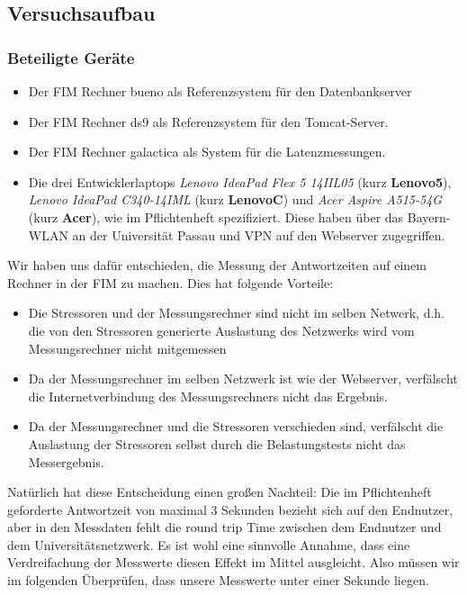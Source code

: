 
\subsection{Versuchsaufbau}

\subsubsection{Beteiligte Geräte}
\begin{itemize}
	\item Der FIM Rechner bueno als Referenzsystem für den Datenbankserver
	\item Der FIM Rechner ds9 als Referenzsystem für den Tomcat-Server.
	\item Der FIM Rechner galactica als System für die Latenzmessungen.
	\item Die drei Entwicklerlaptops \emph{Lenovo IdeaPad Flex 5 14IIL05} (kurz \textbf{Lenovo5}), \emph{Lenovo IdeaPad C340-14IML} (kurz \textbf{LenovoC}) und \emph{Acer Aspire A515-54G} (kurz \textbf{Acer}), wie im Pflichtenheft spezifiziert. Diese haben über das Bayern-WLAN an der Universität Passau und VPN auf den Webserver zugegriffen.
\end{itemize}
Wir haben uns dafür entschieden, die Messung der Antwortzeiten auf einem Rechner in der FIM zu machen. Dies hat folgende Vorteile:
\begin{itemize}
	\item Die Stressoren und der Messungsrechner sind nicht im selben Netwerk, d.h. die von den Stressoren generierte Auslastung des Netzwerks wird vom Messungsrechner nicht mitgemessen
	\item Da der Messungsrechner im selben Netzwerk ist wie der Webserver, verfälscht die Internetverbindung des Messungsrechners nicht das Ergebnis.
	\item Da der Messungsrechner und die Stressoren verschieden sind, verfälscht die Auslastung der Stressoren selbst durch die Belastungstests nicht das Messergebnis.	
\end{itemize}
Natürlich hat diese Entscheidung einen großen Nachteil: Die im Pflichtenheft geforderte Antwortzeit von maximal 3 Sekunden bezieht sich auf den Endnutzer, aber in den Messdaten fehlt die round trip Time zwischen dem Endnutzer und dem Universitätsnetzwerk. Es ist wohl eine sinnvolle Annahme, dass eine Verdreifachung der Messwerte diesen Effekt im Mittel ausgleicht. Also müssen wir im folgenden Überprüfen, dass unsere Messwerte unter einer Sekunde liegen.

